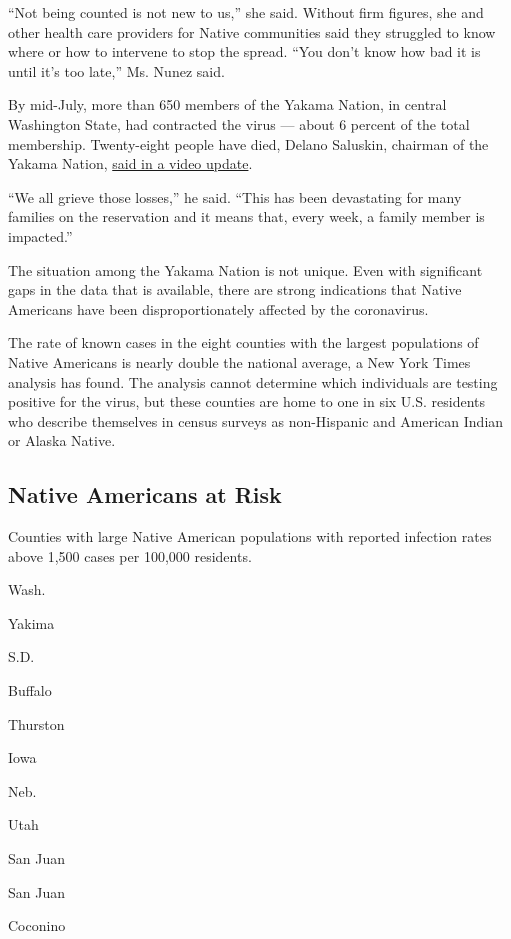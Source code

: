 ``Not being counted is not new to us,'' she said. Without firm figures,
she and other health care providers for Native communities said they
struggled to know where or how to intervene to stop the spread. ``You
don't know how bad it is until it's too late,'' Ms. Nunez said.

By mid-July, more than 650 members of the Yakama Nation, in central
Washington State, had contracted the virus --- about 6 percent of the
total membership. Twenty-eight people have died, Delano Saluskin,
chairman of the Yakama Nation,
\href{https://www.facebook.com/YakamaNationInfo/posts/2901001803343892}{said
in a video update}.

``We all grieve those losses,'' he said. ``This has been devastating for
many families on the reservation and it means that, every week, a family
member is impacted.''

The situation among the Yakama Nation is not unique. Even with
significant gaps in the data that is available, there are strong
indications that Native Americans have been disproportionately affected
by the coronavirus.

The rate of known cases in the eight counties with the largest
populations of Native Americans is nearly double the national average, a
New York Times analysis has found. The analysis cannot determine which
individuals are testing positive for the virus, but these counties are
home to one in six U.S. residents who describe themselves in census
surveys as non-Hispanic and American Indian or Alaska Native.

\hypertarget{native-americans-at-risk}{%
\subsection{Native Americans at Risk}\label{native-americans-at-risk}}

Counties with large Native American populations with reported infection
rates above 1,500 cases per 100,000 residents.

Wash.

Yakima

S.D.

Buffalo

Thurston

Iowa

Neb.

Utah

San Juan

San Juan

Coconino


